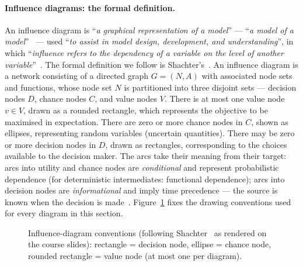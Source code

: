 \paragraph{Influence diagrams: the formal definition.}
An influence diagram is ``\emph{a graphical representation of a model}'' --- ``\emph{a model of a model}''~\cite{turban2011} --- used ``\emph{to assist in model design, development, and understanding}'', in which ``\emph{influence refers to the dependency of a variable on the level of another variable}''~\cite{co4031slides}. The formal definition we follow is Shachter's~\cite{shachter1986}. An influence diagram is a network consisting of a directed graph $G = (N, A)$ with associated node sets and functions, whose node set $N$ is partitioned into three disjoint sets --- decision nodes $D$, chance nodes $C$, and value nodes $V$. There is at most one value node $v \in V$, drawn as a rounded rectangle, which represents the objective to be maximised in expectation. There are zero or more chance nodes in $C$, shown as ellipses, representing random variables (uncertain quantities). There may be zero or more decision nodes in $D$, drawn as rectangles, corresponding to the choices available to the decision maker. The arcs take their meaning from their target: arcs into utility and chance nodes are \emph{conditional} and represent probabilistic dependence (for deterministic intermediates: functional dependence); arcs into decision nodes are \emph{informational} and imply time precedence --- the source is known when the decision is made~\cite{shachter1986}. Figure~\ref{fig:idlegend} fixes the drawing conventions used for every diagram in this section.

\begin{figure}[H]
\centering
{}
\caption{Influence-diagram conventions (following Shachter~\cite{shachter1986} as rendered on the course slides): rectangle = decision node, ellipse = chance node, rounded rectangle = value node (at most one per diagram).}
\label{fig:idlegend}
\end{figure}

